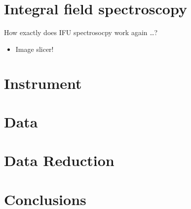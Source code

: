 

\section{Integral field spectroscopy} %
\label{sec:integral_field_spectroscopy}

How exactly does IFU spectrosocpy work again \ldots?

\begin{itemize}
    \item Image slicer!
\end{itemize}


\section{Instrument} %
\label{instrument}


\section{Data} %
\label{data}

\section{Data Reduction} %
\label{data_reduction}


\section{Conclusions} %
\label{sec:conclusions}

